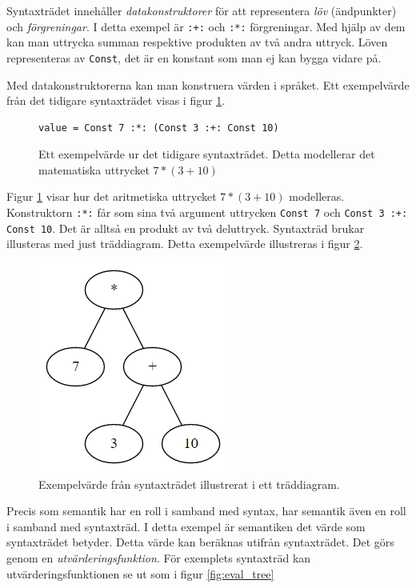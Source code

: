 \begin{draft}
Syntaxträdet innehåller \textit{datakonstruktorer} för att representera \textit{löv} (ändpunkter) och \textit{förgreningar}. I detta exempel är \texttt{:+:} och \texttt{:*:} förgreningar. Med hjälp av dem kan man uttrycka summan respektive produkten av två andra uttryck. Löven representeras av \texttt{Const}, det är en konstant som man ej kan bygga vidare på.

Med datakonstruktorerna kan man konstruera värden i språket. Ett exempelvärde från det tidigare syntaxträdet visas i figur \ref{fig:syntax_exempel_varde}.

\begin{figure}[tph]
  \begin{lstlisting}
value = Const 7 :*: (Const 3 :+: Const 10)
  \end{lstlisting}
  \caption{Ett exempelvärde ur det tidigare syntaxträdet. Detta modellerar det matematiska uttrycket $7 * (3 + 10)$}
  \label{fig:syntax_exempel_varde}
\end{figure}

Figur \ref{fig:syntax_exempel_varde} visar hur det aritmetiska uttrycket $7 * (3 + 10)$ modelleras. Konstruktorn \texttt{:*:} får som sina två argument uttrycken \texttt{Const 7} och \texttt{Const 3 :+: Const 10}. Det är alltså en produkt av två deluttryck. Syntaxträd brukar illusteras med just träddiagram. Detta exempelvärde illustreras i figur \ref{fig:syntax_exempel_bild}.

\begin{figure}[tph]
  \centering
  \includegraphics[width=0.4\linewidth]{figure/syntax_exempel_bild.png}
  \caption{Exempelvärde från syntaxträdet illustrerat i ett träddiagram.}
  \label{fig:syntax_exempel_bild}
\end{figure}

Precis som semantik har en roll i samband med syntax, har semantik även en roll i samband med syntaxträd. I detta exempel är semantiken det värde som syntaxträdet betyder. Detta värde kan beräknas utifrån syntaxträdet. Det görs genom en \textit{utvärderingsfunktion}. För exemplets syntaxträd kan utvärderingsfunktionen se ut som i figur \ref{fig:eval_tree}


\end{draft}
